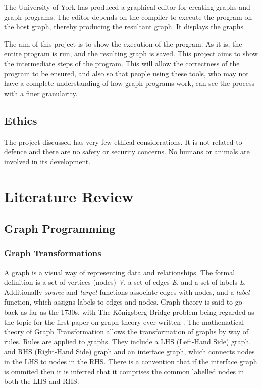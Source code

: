 \documentclass{UoYCSproject}
\begin{document}
The University of York has produced a graphical editor for creating graphs and graph programs. The editor depends on the compiler to execute the program on the host graph, thereby producing the resultant graph. It displays the graphs %

The aim of this project is to show the execution of the program. As it is, the entire program is run, and the resulting graph is saved. This project aims to show the intermediate steps of the program. This will allow the correctness of the program to be ensured, and also so that people using these tools, who may not have a complete understanding of how graph programs work, can see the process with a finer granularity.


\section{Ethics}
The project discussed has very few ethical considerations. It is not related to defence and there are no safety or security concerns. No humans or animals are involved in its development.

\chapter{Literature Review}
\section{Graph Programming}
\subsection{Graph Transformations}
A graph is a visual way of representing data and relationships. The formal definition is a set of vertices (nodes) \emph{V}, a set of edges \emph{E}, and a set of labels \emph{L}. Additionally \emph{source} and \emph{target} functions associate edges with nodes, and a \emph{label} function, which assigns labels to edges and nodes.
Graph theory is said to go back as far as the 1730s, with The K{\"o}nigsberg Bridge problem being regarded as the topic for the first paper on graph theory ever written \cite{grathe_origin}. %
The mathematical theory of Graph Transformation allows the transformation of graphs by way of rules. Rules are applied to graphs. They include a LHS (Left-Hand Side) graph, and RHS (Right-Hand Side) graph and an interface graph, which connects nodes in the LHS to nodes in the RHS. There is a convention that if the interface graph is ommited then it is inferred that it comprises the common labelled nodes in both the LHS and RHS.
\end{document}
